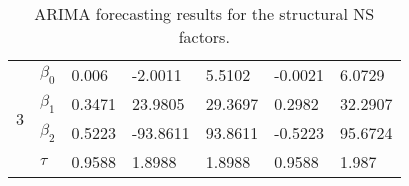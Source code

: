 \begin{table}[htbp]
\begin{tabular}{|l|l|l|l|l|l|l|}
            \multirow{4}{*}{3} & $\beta_0$ & 0.006      & -2.0011  & 5.5102  & -0.0021     & 6.0729  \\ \cline{2-7} 
                               & $\beta_1$ & 0.3471     & 23.9805  & 29.3697 & 0.2982      & 32.2907 \\ \cline{2-7} 
                               & $\beta_2$ & 0.5223     & -93.8611 & 93.8611 & -0.5223     & 95.6724 \\ \cline{2-7} 
                               & $\tau$    & 0.9588     & 1.8988   & 1.8988  & 0.9588      & 1.987   \\ \hline
            \end{tabular}
            \caption{ARIMA forecasting results for the structural NS factors.}
            \label{tab:structuralARIMA}
        \end{table}

